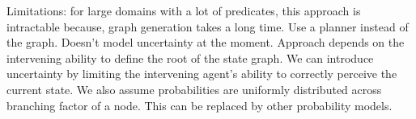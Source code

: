 Limitations: for large domains with a lot of predicates, this approach is intractable because, graph generation takes a long time. Use a planner instead of the graph.
Doesn't model uncertainty at the moment. Approach depends on the intervening ability to define the root of the state graph. We can introduce uncertainty by limiting the intervening agent's ability to correctly perceive the current state.
We also assume probabilities are uniformly distributed across branching factor of a node. This can be replaced by other probability models.








